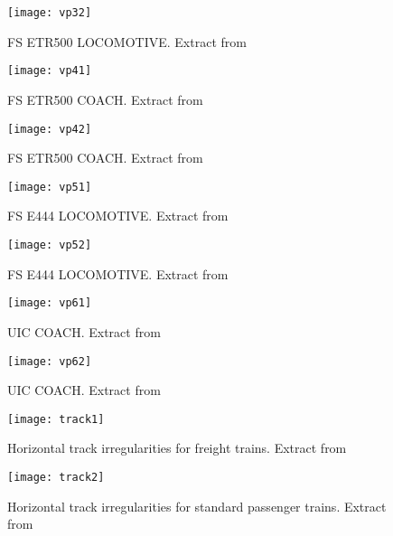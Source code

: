 \begin{appendices}
\begin{figure}[h]
    \centering
    \texttt{[image: vp32]}
    \caption{FS ETR500 LOCOMOTIVE. Extract from \citet[Appendix 2]{d181dt329}}
\end{figure}

\begin{figure}[h]
    \centering
    \texttt{[image: vp41]}
    \caption{FS ETR500 COACH. Extract from \citet[Appendix 2]{d181dt329}}
\end{figure}

\begin{figure}[h]
    \centering
    \texttt{[image: vp42]}
    \caption{FS ETR500 COACH. Extract from \citet[Appendix 2]{d181dt329}}
\end{figure}

\begin{figure}[h]
    \centering
    \texttt{[image: vp51]}
    \caption{FS E444 LOCOMOTIVE. Extract from \citet[Appendix 2]{d181dt329}}
\end{figure}

\begin{figure}[h]
    \centering
    \texttt{[image: vp52]}
    \caption{FS E444 LOCOMOTIVE. Extract from \citet[Appendix 2]{d181dt329}}
\end{figure}

\begin{figure}[h]
    \centering
    \texttt{[image: vp61]}
    \caption{UIC COACH. Extract from \citet[Appendix 2]{d181dt329}}
    \label{fig:uicoach}
\end{figure}

\begin{figure}[h]
    \centering
    \texttt{[image: vp62]}
    \caption{UIC COACH. Extract from \citet[Appendix 2]{d181dt329}}
\end{figure}

\begin{figure}[h]    \centering
    \texttt{[image: track1]}
    \caption{Horizontal track irregularities for freight trains. Extract from \citet[Figure 2.1]{d181}}
    \label{fig:track1}
\end{figure}

\begin{figure}[h]
    \centering
    \texttt{[image: track2]}
    \caption{Horizontal track irregularities for standard passenger trains. Extract from \citet[Figure 2.1]{d181}}
\end{figure}


\end{appendices}
